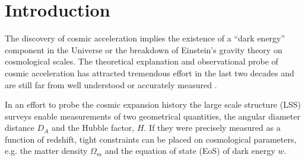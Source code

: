 \documentclass[iop]{emulateapj}
\begin{document}



\section{Introduction}

The discovery of cosmic acceleration \citep{Riess1998,Perl1999} implies the existence of a ``dark energy'' component in the Universe 
or the breakdown of Einstein's gravity theory on cosmological scales.
The theoretical explanation and observational probe of cosmic acceleration has attracted 
tremendous effort in the last two decades and are still far from well understood or accurately measured \citep{SW1989,Li2011,DHW2013}.


In an effort to probe the cosmic expansion history the large scale structure (LSS) surveys enable measurements of two geometrical quantities, 
the angular diameter distance $D_A$ and the Hubble factor, $H$. 
If they were precisely measured as a function of redshift, 
tight constraints can be placed on cosmological parameters, 
e.g. the matter density $\Omega_m$ and the equation of state (EoS) of dark energy $w$.
\end{document}
